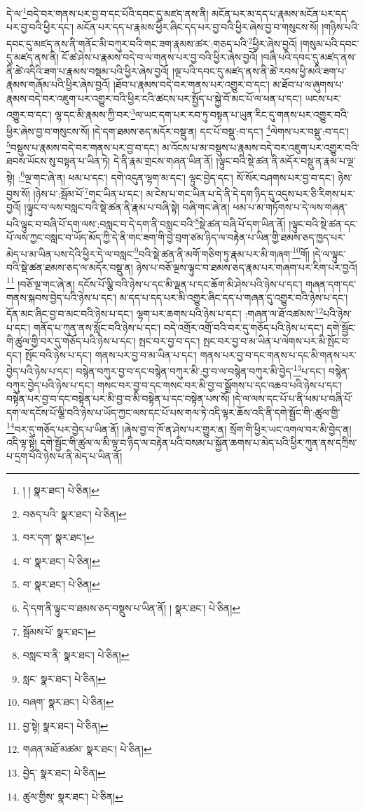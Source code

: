 དེ་ལ་\footnote{། །  སྣར་ཐང་།  པེ་ཅིན། }བདེ་བར་གནས་པར་བྱ་བ་དང་པོའི་དབང་དུ་མཛད་ནས་ནི། མངོན་པར་མ་དད་པ་རྣམས་མངོན་པར་དད་པར་བྱ་བའི་ཕྱིར་དང་། མངོན་པར་དད་པ་རྣམས་ཕྱིར་ཞིང་དད་པར་བྱ་བའི་ཕྱིར་ཞེས་བྱ་བ་གསུངས་སོ། །གཉིས་པའི་དབང་དུ་མཛད་ནས་ནི་གནོང་མི་བཀུར་བའི་གང་ཟག་རྣམས་ཚར་:གཅད་པའི་\footnote{བཅད་པའི་  སྣར་ཐང་།  པེ་ཅིན། }ཕྱིར་ཞེས་བྱའོ། །གསུམ་པའི་དབང་དུ་མཛད་ནས་ནི། ངོ་ཚ་ཤེས་པ་རྣམས་བདེ་བ་ལ་གནས་པར་བྱ་བའི་ཕྱིར་ཞེས་བྱའོ། །བཞི་པའི་དབང་དུ་མཛད་ནས་ནི་ཚེ་འདིའི་ཟག་པ་རྣམས་བསྡམ་པའི་ཕྱིར་ཞེས་བྱའོ། །ལྔ་པའི་དབང་དུ་མཛད་ནས་ནི་ཚེ་རབས་ཕྱི་མའི་ཟག་པ་རྣམས་གཞོམ་པའི་ཕྱིར་ཞེས་བྱའོ། །ཐོབ་པ་རྣམས་བདེ་བར་གནས་པར་འགྱུར་བ་དང་། མ་ཐོབ་པ་ལ་ཞུགས་པ་རྣམས་བདེ་བར་འཇུག་པར་འགྱུར་བའི་ཕྱིར་ངའི་ཚངས་པར་སྤྱོད་པ་སྐྱེ་བོ་མང་པོ་ལ་ཕན་པ་དང་། ཡངས་པར་འགྱུར་བ་དང་། ལྷ་དང་མི་རྣམས་ཀྱི་བར་\footnote{བར་དག་  སྣར་ཐང་། }ལ་ཡང་དག་པར་རབ་ཏུ་བསྟན་པ་ཡུན་རིང་དུ་གནས་པར་འགྱུར་བའི་ཕྱིར་ཞེས་བྱ་བ་གསུངས་སོ། །དེ་དག་ཐམས་ཅད་མདོར་བསྡུ་ན། དང་པོ་བསྡུ་:བ་དང་། \footnote{བ་  སྣར་ཐང་།  པེ་ཅིན། }ལེགས་པར་བསྡུ་:བ་དང་། \footnote{བ་  སྣར་ཐང་།  པེ་ཅིན། }བསྡུས་པ་རྣམས་བདེ་བར་གནས་པར་བྱ་བ་དང་། མ་འོངས་པ་མ་བསྡུས་པ་རྣམས་བདེ་བར་འཇུག་པར་འགྱུར་བའི་ཐབས་ཡོངས་སུ་བསྟན་པ་ཡིན་ཏེ། དེ་ནི་རྣམ་གྲངས་གཞན་ཡིན་ནོ། །ལྟུང་བའི་སྡེ་ཚན་ནི་མདོར་བསྡུ་ན་རྣམ་པ་ལྔ་སྟེ། :\footnote{དེ་དག་ནི་ལྟུང་བ་ཐམས་ཅད་བསྡུས་པ་ཡིན་ནོ། །  སྣར་ཐང་།  པེ་ཅིན། }ལྔ་གང་ཞེ་ན། ཕམ་པ་དང་། དགེ་འདུན་ལྷག་མ་དང་། ལྟུང་བྱེད་དང་། སོ་སོར་བཤགས་པར་བྱ་བ་དང་། ཉེས་བྱས་སོ། །ཉེས་པ་:སྦོམ་པོ་\footnote{སྦོམས་པོ་  སྣར་ཐང་། }གང་ཡིན་པ་དང་། མ་ངེས་པ་གང་ཡིན་པ་དེ་ནི་དེ་དག་ཉིད་དུ་འདུས་པར་ཅི་རིགས་པར་བྱའོ། །ལྟུང་བ་ལས་བསླང་བའི་སྡེ་ཚན་ནི་རྣམ་པ་བཞི་སྟེ། བཞི་གང་ཞེ་ན། ཕམ་པ་མ་གཏོགས་པ་དེ་ལས་གཞན་པའི་ལྟུང་བ་བཞི་པོ་དག་ལས་:བསླང་བ་དེ་དག་ནི་བསླང་བའི་\footnote{བསླང་བ་ནི་  སྣར་ཐང་།  པེ་ཅིན། }སྡེ་ཚན་བཞི་པོ་དག་ཡིན་ནོ། །ལྟུང་བའི་སྡེ་ཚན་དང་པོ་ལས་ཀྱང་བསླང་བ་ཡོད་མོད་ཀྱི་དེ་ནི་གང་ཟག་གི་བྱེ་བྲག་ཙམ་ཉིད་ལ་བརྟེན་པ་ཡིན་གྱི་ཐམས་ཅད་ཁྱད་པར་མེད་པ་མ་ཡིན་པས་དེའི་ཕྱིར་དེ་ལ་བསླང་\footnote{སླང་  སྣར་ཐང་།  པེ་ཅིན། }བའི་སྡེ་ཚན་ནི་མགོ་གཅིག་ཏུ་རྣམ་པར་མི་གཞག་\footnote{བཞག་  སྣར་ཐང་།  པེ་ཅིན། }གོ། །དེ་ལ་ལྟུང་བའི་སྡེ་ཚན་ཐམས་ཅད་ལ་མདོར་བསྡུ་ན། ཉེས་པ་བཅོ་ལྔས་ལྟུང་བ་ཐམས་ཅད་རྣམ་པར་གཞག་པར་རིག་པར་བྱའོ།\footnote{བྱ་སྟེ།  སྣར་ཐང་།  པེ་ཅིན། } །བཅོ་ལྔ་གང་ཞེ་ན། དངོས་པོ་ལྕི་བའི་ཉེས་པ་དང་མི་ལྡན་པ་དང་ཆོག་མི་ཤེས་པའི་ཉེས་པ་དང་། གཞན་དག་དང་གནས་སྐབས་བྱེད་པའི་ཉེས་པ་དང་། མ་དད་པ་དད་པར་མི་འགྱུར་ཞིང་དད་པ་གཞན་དུ་འགྱུར་བའི་ཉེས་པ་དང་། དོན་མང་ཞིང་བྱ་བ་མང་བའི་ཉེས་པ་དང་། ལྷག་པར་ཆགས་པའི་ཉེས་པ་དང་། :གཞན་ལ་ཐོ་འཚམས་\footnote{གཞན་མཐོ་མཚམ་  སྣར་ཐང་།  པེ་ཅིན། }པའི་ཉེས་པ་དང་། གནོད་པ་ཀུན་ནས་སློང་བའི་ཉེས་པ་དང་། བདེ་འགྲོར་འགྲོ་བའི་བར་དུ་གཅོད་པའི་ཉེས་པ་དང་། དགེ་སྦྱོང་གི་ཚུལ་གྱི་བར་དུ་གཅོད་པའི་ཉེས་པ་དང་། སྤང་བར་བྱ་བ་དང་། སྤང་བར་བྱ་བ་མ་ཡིན་པ་ལེགས་པར་མི་སྤོང་བ་དང་། སྤོང་བའི་ཉེས་པ་དང་། གནས་པར་བྱ་བ་མ་ཡིན་པ་དང་། གནས་པར་བྱ་བ་དང་གནས་པ་དང་མི་གནས་པར་བྱེད་པའི་ཉེས་པ་དང་། བསྙེན་བཀུར་བྱ་བ་དང་བསྙེན་བཀུར་མི་:བྱ་བ་ལ་བསྙེན་བཀུར་མི་བྱེད་\footnote{བྱེད་  སྣར་ཐང་།  པེ་ཅིན། }པ་དང་། བསྙེན་བཀུར་བྱེད་པའི་ཉེས་པ་དང་། གསང་བར་བྱ་བ་དང་གསང་བར་མི་བྱ་བ་སྒྲོགས་པ་དང་འཆབ་པའི་ཉེས་པ་དང་། བསྟེན་པར་བྱ་བ་དང་བསྟེན་པར་མི་བྱ་བ་མི་བསྟེན་པ་དང་བསྟེན་པས་སོ། །དེ་ལ་ལས་དང་པོ་པ་ནི་ཕམ་པ་བཞི་པོ་དག་ལ་དངོས་པོ་ལྕི་བའི་ཉེས་པ་ཡོད་ཀྱང་ལས་དང་པོ་པས་གལ་ཏེ་འདི་ལྟར་ཆོས་འདི་ནི་དགེ་སྦྱོང་གི་:ཚུལ་གྱི་\footnote{ཚུལ་གྱིས་  སྣར་ཐང་།  པེ་ཅིན། }བར་དུ་གཅོད་པར་བྱེད་པ་ཡིན་ནོ། །ཞེས་བྱ་བ་ཁོ་ན་ཤེས་པར་གྱུར་ན། སྲོག་གི་ཕྱིར་ཡང་འགལ་བར་མི་བྱེད་ན། འདི་ལྟ་སྟེ། དགེ་སྦྱོང་གི་ཚུལ་ལ་མི་ལྟ་བ་ཉིད་ལ་བརྟེན་པའི་བསམ་པ་སྐྱོན་ཆགས་པ་མེད་པའི་ཕྱིར་ཀུན་ནས་དཀྲིས་པ་དྲག་པོའི་ཉེས་པ་ནི་མེད་པ་ཡིན་ནོ། 